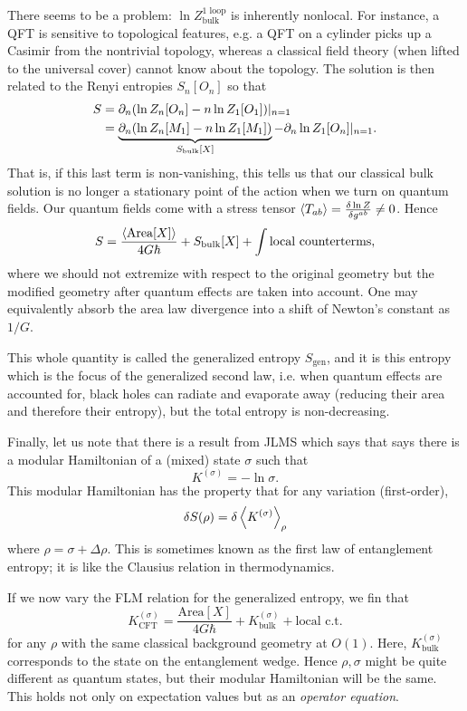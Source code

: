 There seems to be a problem: $\ln Z_\text{bulk}^\text{1 loop}$ is inherently nonlocal. For instance, a QFT is sensitive to topological features, e.g. a QFT on a cylinder picks up a Casimir from the nontrivial topology, whereas a classical field theory (when lifted to the universal cover) cannot know about the topology. The solution is then related to the Renyi entropies $S_n[O_n]$ so that
\begin{align}
    S &=\partial_n (\ln Z_n[O_n] -n\ln Z_1[O_1])|_{n=1}\\
        &= \underbrace{\partial_n(\ln Z_n[M_1]- n \ln Z_1[M_1])}_{S_\text{bulk}[X]} - \partial_n \ln Z_1[O_n]|_{n=1}.
\end{align}
That is, if this last term is non-vanishing, this tells us that our classical bulk solution is no longer a stationary point of the action when we turn on quantum fields. Our quantum fields come with a stress tensor $\left< T_{ab} \right>=\frac{\delta \ln Z}{\delta g^{ab}} \neq 0$. Hence
\begin{equation}
    S=\frac{\left< \text{Area}[X] \right>}{4G\hbar}+S_\text{bulk}[X]+\int\text{local counterterms},
\end{equation}
where we should not extremize with respect to the original geometry but the modified geometry after quantum effects are taken into account. One may equivalently absorb the area law divergence into a shift of Newton's constant as $1/G$.

This whole quantity is called the generalized entropy $S_\text{gen}$, and it is this entropy which is the focus of the generalized second law, i.e. when quantum effects are accounted for, black holes can radiate and evaporate away (reducing their area and therefore their entropy), but the total entropy is non-decreasing.

Finally, let us note that there is a result from JLMS which says that says there is a modular Hamiltonian of a (mixed) state $\sigma$ such that
\begin{equation}
    K^{(\sigma)}=-\ln \sigma.
\end{equation}
This modular Hamiltonian has the property that for any variation (first-order),
\begin{equation}
    \delta S(\rho)= \delta \left< K^{(\sigma)} \right>_\rho
\end{equation}
where $\rho=\sigma +\Delta \rho$. This is sometimes known as the first law of entanglement entropy; it is like the Clausius relation in thermodynamics.

If we now vary the FLM relation for the generalized entropy, we fin that
\begin{equation}
    K_\text{CFT}^{(\sigma)}= \frac{\text{Area}[X]}{4G\hbar} + K_\text{bulk}^{(\sigma)} +\text{local c.t.}
\end{equation}
for any $\rho$ with the same classical background geometry at $O(1)$. Here, $K_\text{bulk}^{(\sigma)}$ corresponds to the state on the entanglement wedge. Hence $\rho,\sigma$ might be quite different as quantum states, but their modular Hamiltonian will be the same. This holds not only on expectation values but as an \emph{operator equation}.

